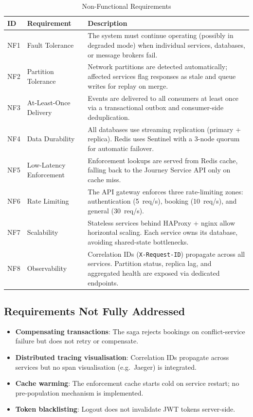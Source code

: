 \documentclass[12pt,a4paper]{article}
\begin{document}
\begin{table}[H]
\centering
\small
\caption{Non-Functional Requirements}
\begin{tabularx}{\textwidth}{C{0.6cm} L{3.5cm} X}
  \toprule
  \textbf{ID} & \textbf{Requirement} & \textbf{Description} \\
  \midrule
  NF1 & Fault Tolerance & The system must continue operating (possibly in degraded mode) when individual services, databases, or message brokers fail. \\
  NF2 & Partition Tolerance & Network partitions are detected automatically; affected services flag responses as stale and queue writes for replay on merge. \\
  NF3 & At-Least-Once Delivery & Events are delivered to all consumers at least once via a transactional outbox and consumer-side deduplication. \\
  NF4 & Data Durability & All databases use streaming replication (primary + replica). Redis uses Sentinel with a 3-node quorum for automatic failover. \\
  NF5 & Low-Latency Enforcement & Enforcement lookups are served from Redis cache, falling back to the Journey Service API only on cache miss. \\
  NF6 & Rate Limiting & The API gateway enforces three rate-limiting zones: authentication (5~req/s), booking (10~req/s), and general (30~req/s). \\
  NF7 & Scalability & Stateless services behind HAProxy + nginx allow horizontal scaling. Each service owns its database, avoiding shared-state bottlenecks. \\
  NF8 & Observability & Correlation IDs (\texttt{X-Request-ID}) propagate across all services. Partition status, replica lag, and aggregated health are exposed via dedicated endpoints. \\
  \bottomrule
\end{tabularx}
\end{table}

\subsection{Requirements Not Fully Addressed}

\begin{itemize}[nosep]
  \item \textbf{Compensating transactions}: The saga rejects bookings on conflict-service failure but does not retry or compensate.
  \item \textbf{Distributed tracing visualisation}: Correlation IDs propagate across services but no span visualisation (e.g.\ Jaeger) is integrated.
  \item \textbf{Cache warming}: The enforcement cache starts cold on service restart; no pre-population mechanism is implemented.
  \item \textbf{Token blacklisting}: Logout does not invalidate JWT tokens server-side.
\end{itemize}
\end{document}
